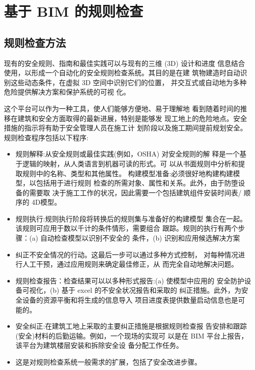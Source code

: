 \section{基于 BIM 的规则检查}
\subsection{规则检查方法}
现有的安全规则、指南和最佳实践可以与现有的三维 (3D) 设计和进度
信息结合使用，以形成一个自动化的安全规则检查系统。其目的是在建
筑物建造时自动识别这些动态条件，在虚拟 3D 空间中识别它们的位置，
并交互式或自动地为多种危险提供解决方案和保护系统的可视
化。

这个平台可以作为一种工具，使人们能够方便地、易于理解地
看到随着时间的推移在建筑和安全方面取得的最新进展，特别是能够发
现工地上的危险地点。安全措施的指示将有助于安全管理人员在施工计
划阶段以及施工期间提前规划安全。规则检查程序包括以下程序:

\begin{itemize}
    \item 规则解释:从安全规则或最佳实践(例如，OSHA) 对安全规则的解
    释是一个基于逻辑的映射，从人类语言到机器可读的形式。可
    以从书面规则中分析和提取规则中的名称、类型和其他属性。
    构建模型准备:必须很好地构建构建模型，以包括用于进行规则
    检查的所需对象、属性和关系。此外，由于防堕设备的需要取
    决于施工工作的状况，因此需要一个包括建筑组件安装时间表/
    顺序的 4D模型。
    \item 规则执行:规则执行阶段将转换后的规则集与准备好的构建模型
    集合在一起。该规则可应用于数以千计的条件情形，需要组合
    跟踪。规则的执行有两个步骤：(a) 自动检查模型以识别不安全的
    条件，(b) 识别和应用候选解决方案
    \item 纠正不安全情况的行动。这最后一步可以通过多种方式控制，
    对每种情况进行人工干预，通过应用规则来确定最佳修正，从
    而完全自动地解决问题。
    \item 规则检查报告：检查结果可以以多种形式报告:(a) 使模型中应用的
    安全防护设备可视化，(b) 基于 excel 的不安全状况报告和采取的
    纠正措施。此外，为安全设备的资源平衡和将生成的信息导入
    项目进度表提供数量启动信息也是可能的。
    \item 安全纠正:在建筑工地上采取的主要纠正措施是根据规则检查报
    告安排和跟踪(安全)材料的后勤运输。例如，一个现场的实现可
    以是在 BIM 平台上报告，该平台为建筑楼层安装和拆除安全设
    备分配工作任务。
    \item 这是对规则检查系统一般需求的扩展，包括了安全改进步骤。
\end{itemize}


